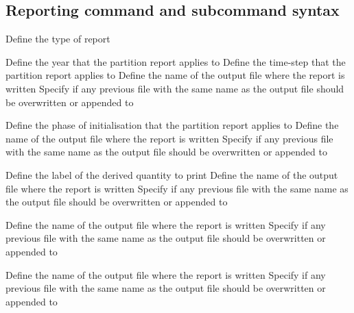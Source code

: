 \subsection{Reporting command and subcommand syntax}\par
{}\par\par
{} {Define the type of report}
\par\textbf{}\par
{} {Define the year that the partition report applies to}
 {Define the time-step that the partition report applies to}
 {Define the name of the output file where the report is written}
 {Specify if any previous file with the same name as the output file should be overwritten or appended to}
\par\textbf{}\par
{} {Define the phase of initialisation that the partition report applies to}
 {Define the name of the output file where the report is written}
 {Specify if any previous file with the same name as the output file should be overwritten or appended to}
\par\textbf{}\par
{} {Define the label of the derived quantity to print}
 {Define the name of the output file where the report is written}
 {Specify if any previous file with the same name as the output file should be overwritten or appended to}
\par\textbf{}\par
{} {Define the name of the output file where the report is written}
 {Specify if any previous file with the same name as the output file should be overwritten or appended to}
\par\textbf{}\par
{} {Define the name of the output file where the report is written}
 {Specify if any previous file with the same name as the output file should be overwritten or appended to}
\par\textbf{}\par
